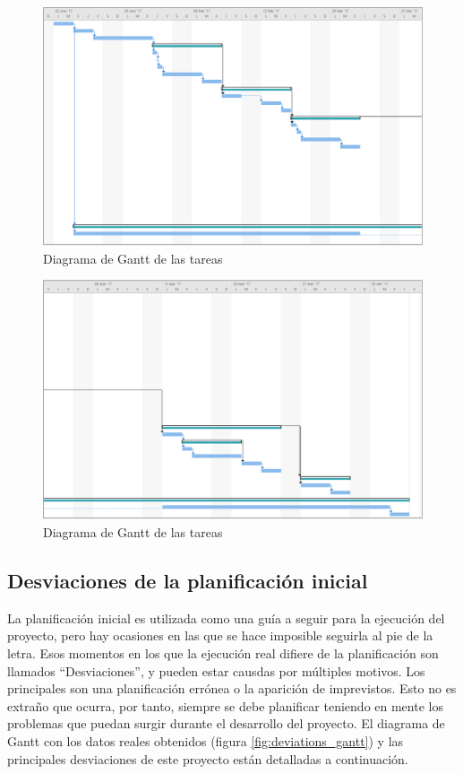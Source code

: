 \documentclass[12pt, twoside]{article}
\begin{document}
        \begin{figure}[h!]
            \centering
                \includegraphics[scale=0.3]{tasks_gantt0.eps}
                \caption{Diagrama de Gantt de las tareas}
                \label{fig:tasks_gantt0}
        \end{figure}

        \begin{figure}[h!]
            \centering
                \includegraphics[scale=0.3]{tasks_gantt1.eps}
                \caption{Diagrama de Gantt de las tareas}
                \label{fig:tasks_gantt1}
        \end{figure}

    \subsection{Desviaciones de la planificación inicial}
        La planificación inicial es utilizada como una guía a seguir para la ejecución del proyecto, pero hay ocasiones en las que se hace imposible seguirla al pie de la letra. Esos momentos en los que la ejecución real difiere de la planificación son llamados ``Desviaciones'', y pueden estar causdas por múltiples motivos. Los principales son una planificación errónea o la aparición de imprevistos. Esto no es extraño que ocurra, por tanto, siempre se debe planificar teniendo en mente los problemas que puedan surgir durante el desarrollo del proyecto. El diagrama de Gantt con los datos reales obtenidos (figura \ref{fig:deviations_gantt}) y las principales desviaciones de este proyecto están detalladas a continuación.
\end{document}
